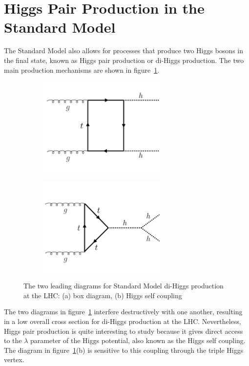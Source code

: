 \section{Higgs Pair Production in the Standard Model}

The Standard Model also allows for processes that produce two Higgs bosons in the final state, known as Higgs pair production or di-Higgs production. The two main production mechanisms are shown in figure~\ref{fig:diHiggs}.
%
\begin{figure}[h!]
  \centering
  \captionsetup{justification=centering}

   \begin{subfigure}[t]{0.5\textwidth}
        \centering
        \includegraphics[width=0.7\textwidth]{figures/HH_box}
        \caption{}
    \end{subfigure}%
    \begin{subfigure}[t]{0.5\textwidth}
        \centering
        \includegraphics[width=0.7\textwidth]{figures/HH_lambda}
        \caption{}
    \end{subfigure}
   \caption{The two leading diagrams for Standard Model di-Higgs production at the LHC: (a) box diagram, (b) Higgs self coupling}
  \label{fig:diHiggs}
\end{figure}
%
The two diagrams in figure~\ref{fig:diHiggs} interfere destructively with one another, resulting in a low overall cross section for di-Higgs production at the LHC. Nevertheless, Higgs pair production is quite interesting to study because it gives direct access to the $\lambda$ parameter of the Higgs potential, also known as the Higgs self coupling. The diagram in figure~\ref{fig:diHiggs}(b) is sensitive to this coupling through the triple Higgs vertex.  


